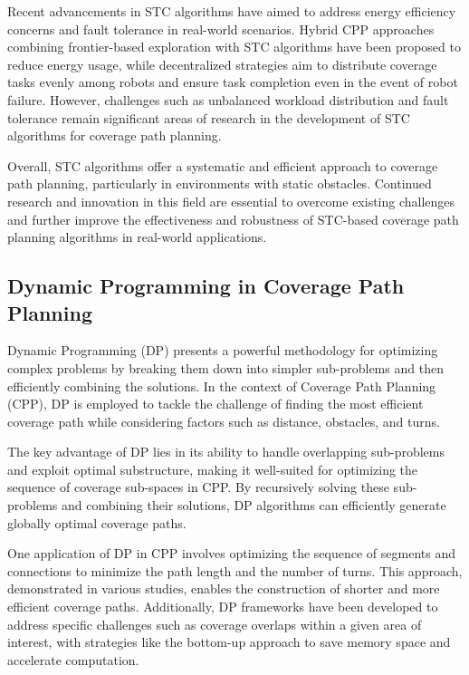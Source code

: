 \vspace*{6mm}

Recent advancements in STC algorithms have aimed to address energy efficiency concerns and fault tolerance in real-world scenarios. Hybrid CPP approaches combining frontier-based exploration with STC algorithms have been proposed to reduce energy usage, while decentralized strategies aim to distribute coverage tasks evenly among robots and ensure task completion even in the event of robot failure. However, challenges such as unbalanced workload distribution and fault tolerance remain significant areas of research in the development of STC algorithms for coverage path planning.

\vspace*{6mm}

Overall, STC algorithms offer a systematic and efficient approach to coverage path planning, particularly in environments with static obstacles. Continued research and innovation in this field are essential to overcome existing challenges and further improve the effectiveness and robustness of STC-based coverage path planning algorithms in real-world applications.

\subsection{Dynamic Programming in Coverage Path Planning}

Dynamic Programming (DP) presents a powerful methodology for optimizing complex problems by breaking them down into simpler sub-problems and then efficiently combining the solutions. In the context of Coverage Path Planning (CPP), DP is employed to tackle the challenge of finding the most efficient coverage path while considering factors such as distance, obstacles, and turns.

\vspace*{6mm}

The key advantage of DP lies in its ability to handle overlapping sub-problems and exploit optimal substructure, making it well-suited for optimizing the sequence of coverage sub-spaces in CPP. By recursively solving these sub-problems and combining their solutions, DP algorithms can efficiently generate globally optimal coverage paths.

\vspace*{6mm}

One application of DP in CPP involves optimizing the sequence of segments and connections to minimize the path length and the number of turns. This approach, demonstrated in various studies, enables the construction of shorter and more efficient coverage paths. Additionally, DP frameworks have been developed to address specific challenges such as coverage overlaps within a given area of interest, with strategies like the bottom-up approach to save memory space and accelerate computation.

